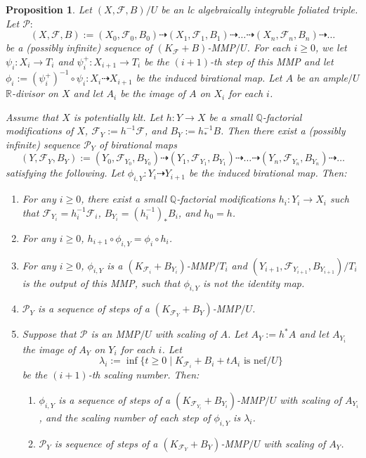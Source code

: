 \documentclass[11pt]{amsart}
\numberwithin{equation}{section}
\newcommand{\Qq}{\mathbb{Q}}
\newcommand{\Rr}{\mathbb{R}}
\newcommand{\Ff}{\mathcal{F}}
\newtheorem{prop}[thm]{Proposition}
\theoremstyle{definition}
\theoremstyle{definition}
\theoremstyle{definition}
\begin{document}
\begin{prop}\label{prop: small lift mmp}
    Let $(X,\Ff,B)/U$ be an lc algebraically integrable foliated triple. Let $\mathcal{P}:$
$$(X,\Ff,B):=(X_0,\Ff_0,B_0)\dashrightarrow (X_1,\Ff_1,B_1)\dashrightarrow\dots\dashrightarrow (X_n,\Ff_n,B_n)\dashrightarrow\dots$$
be a (possibly infinite) sequence of $(K_{\Ff}+B)$-MMP$/U$. For each $i\geq 0$, we let $\psi_i: X_i\rightarrow T_i$ and $\psi_i^+:X_{i+1}\rightarrow T_{i}$ be the $(i+1)$-th step of this MMP and let $\phi_i:=(\psi_{i}^+)^{-1}\circ\psi_i: X_i\dashrightarrow X_{i+1}$ be the induced birational map. Let $A$ be an ample$/U$ $\Rr$-divisor on $X$ and let $A_i$ be the image of $A$ on $X_i$ for each $i$.

Assume that $X$ is potentially klt. Let $h: Y\rightarrow X$ be a small $\Qq$-factorial modifications of $X$, $\Ff_Y:=h^{-1}\Ff$, and $B_Y:=h^{-1}_*B$. Then there exist a (possibly infinite) sequence $\mathcal{P}_Y$ of birational maps 
$$(Y,\Ff_Y,B_Y):=(Y_0,\Ff_{Y_0},B_{Y_0})\dashrightarrow (Y_1,\Ff_{Y_1},B_{Y_1})\dashrightarrow\dots\dashrightarrow (Y_n,\Ff_{Y_n},B_{Y_n})\dashrightarrow\dots$$
satisfying the following. Let $\phi_{i,Y}: Y_i\dashrightarrow Y_{i+1}$ be the induced birational map. Then:
\begin{enumerate}
\item For any $i\geq 0$, there exist a small $\Qq$-factorial modifications $h_i: Y_i\rightarrow X_i$ such that $\Ff_{Y_i}=h_i^{-1}\Ff_i$, $B_{Y_i}=(h_i^{-1})_*B_i$, and $h_0=h$.
\item For any $i\geq 0$, $h_{i+1}\circ\phi_{i,Y}=\phi_i\circ h_i$.
\item For any $i\geq 0$, $\phi_{i,Y}$ is a $(K_{\Ff_i}+B_{Y_i})$-MMP$/T_i$ and $(Y_{i+1},\Ff_{Y_{i+1}},B_{Y_{i+1}})/T_i$ is the output of this MMP, such that $\phi_{i,Y}$ is not the identity map.
\item $\mathcal{P}_Y$ is a sequence of steps of a $(K_{\Ff_Y}+B_Y)$-MMP$/U$.
\item Suppose that $\mathcal{P}$ is an MMP$/U$ with scaling of $A$. Let $A_{Y}:=h^*A$ and let $A_{Y_i}$ the image of $A_Y$ on $Y_i$ for each $i$. Let
$$\lambda_i:=\inf\{t\geq 0\mid K_{\Ff_i}+B_i+tA_i\text{ is nef}/U\}$$
be the $(i+1)$-th scaling number. Then:
\begin{enumerate}
    \item $\phi_{i,Y}$ is a sequence of steps of a $(K_{\Ff_{Y_i}}+B_{Y_i})$-MMP$/U$ with scaling of $A_{Y_i}$, and the scaling number of each step of $\phi_{i,Y}$ is $\lambda_i$.
    \item $\mathcal{P}_Y$ is sequence of steps of a $(K_{\Ff_Y}+B_Y)$-MMP$/U$ with scaling of $A_Y$.
\end{enumerate}
\end{enumerate}
\end{prop}
\end{document}
